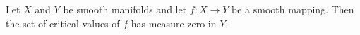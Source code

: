 Let $X$ and $Y$ be smooth manifolds and let $f: X \to Y$ be a smooth mapping. Then the set of critical values of $f$ has measure zero in $Y$.
